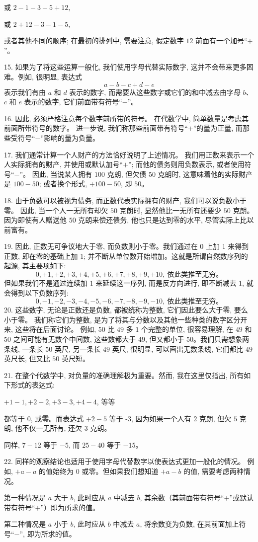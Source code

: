 	或 $2 - 1 - 3 - 5 + 12$, \par
	或 $2 + 12 - 3 - 1 - 5$, \par
	或者其他不同的顺序; 在最初的排列中, 需要注意, 假定数字 $12$ 前面有一个加号“$+$”。
\par
15. 如果为了将这些运算一般化, 我们使用字母代替实际数字, 这并不会带来更多困难。例如, 很明显, 表达式
\[
	a - b - c + d - e
\]
	表示我们有由 $a$ 和 $d$ 表示的数字, 
	而需要从这些数字或它们的和中减去由字母 $b$、$c$ 和 $e$ 表示的数字, 
	它们前面带有符号“$-$”。
\par
16. 因此, 必须严格注意每个数字前所带的符号。
	在代数学中, 简单数量是考虑其前面所带符号的数字。
	进一步说, 我们称那些前面带有符号“$+$”的量为正量, 
	而那些受符号“$-$”影响的量为负量。
\par
17. 我们通常计算一个人财产的方法恰好说明了上述情况。
	我们用正数来表示一个人实际拥有的财产, 
	并使用或默认加号“$+$”; 
	而他的债务则用负数表示, 
	或者使用符号“$-$”。
	因此, 当说某人拥有 $100$ 克朗, 
	但欠债 $50$ 克朗时, 
	这意味着他的实际财产是 $100 - 50$; 或者换个形式, $+100 - 50$, 即 $50$。
\par
18. 由于负数可以被视为债务, 而正数代表实际拥有的财产, 我们可以说负数小于零。
因此, 当一个人一无所有却欠 $50$ 克朗时, 显然他比一无所有还要少 $50$ 克朗。
因为即使有人赠送他 $50$ 克朗来偿还债务, 他也只是达到零的水平, 尽管实际上比以前富有。
\par
19. 因此, 正数无可争议地大于零, 而负数则小于零。我们通过在 $0$ 上加 $1$ 来得到正数, 即在零的基础上加 $1$; 
并不断从单位数开始增加。这就是所谓自然数序列的起源, 其主要项如下: 
\[
0, +1, +2, +3, +4, +5, +6, +7, +8, +9, +10, \ \text{依此类推至无穷。}
\] 
但如果我们不是通过连续加 $1$ 来延续这一序列, 而是反方向进行, 即不断减去 $1$, 就会得到以下负数序列: 
\[
0, -1, -2, -3, -4, -5, -6, -7, -8, -9, -10, \ \text{依此类推至无穷。}
\] 
20. 这些数字, 无论是正数还是负数, 都被统称为整数, 它们因此要么大于零, 要么小于零。
我们称它们为整数, 是为了将其与分数以及其他一些种类的数字区分开来, 这些将在后面讨论。
例如, $50$ 比 $49$ 多 $1$ 个完整的单位, 很容易理解, 在 $49$ 和 $50$ 之间可能有无数个中间数, 
这些数都大于 $49$, 但又都小于 $50$。我们只需想象两条线, 
一条长 $50$ 英尺, 另一条长 $49$ 英尺, 很明显, 可以画出无数条线, 它们都比 $49$ 英尺长, 但又比 $50$ 英尺短。
\par
21. 在整个代数学中, 对负量的准确理解极为重要。然而, 我在这里仅指出, 所有如下形式的表达式: \par
	$+1 - 1, +2 - 2, +3 - 3, +4 - 4$, 等等\par
	都等于 $0$, 或零。而表达式
	$+2 - 5$ 等于 -3, 
	因为如果一个人有 $2$ 克朗, 
	但欠 $5$ 克朗, 他不仅一无所有, 还欠 $3$ 克朗。\par
	同样, $7 - 12$ 等于 $-5$, 
	而 $25 - 40$ 等于 $-15$。  
\par
22. 同样的观察结论也适用于使用字母代替数字以使表达式更加一般化的情况。
	例如, $+a - a$ 的值始终为 $0$ 或零。但如果我们想知道 $+a - b$ 的值, 需要考虑两种情况。\par
	第一种情况是 $a$ 大于 $b$, 此时应从 $a$ 中减去 $b$, 
	其余数（其前面带有符号“$+$”或默认带有符号“$+$”）即为所求的值。\par
	第二种情况是 $a$ 小于 $b$, 此时应从 $b$ 中减去 $a$, 
	将余数变为负数, 在其前面加上符号“$-$”, 即为所求的值。  
\par

